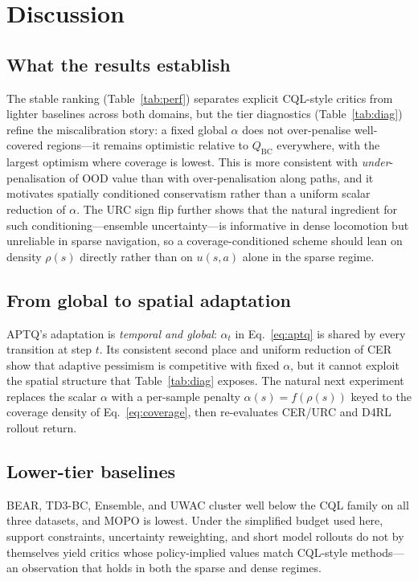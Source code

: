\documentclass[conference]{IEEEtran}
\begin{document}
\section{Discussion}
\label{sec:discussion}

\subsection{What the results establish}

The stable ranking (Table~\ref{tab:perf}) separates explicit CQL-style
critics from lighter baselines across both domains, but the tier diagnostics
(Table~\ref{tab:diag}) refine the miscalibration story: a fixed global
$\alpha$ does not over-penalise well-covered regions---it remains optimistic
relative to $Q_{\mathrm{BC}}$ everywhere, with the largest optimism where
coverage is lowest. This is more consistent with \emph{under}-penalisation of
OOD value than with over-penalisation along paths, and it motivates
spatially conditioned conservatism rather than a uniform scalar reduction of
$\alpha$. The URC sign flip further shows that the natural ingredient for
such conditioning---ensemble uncertainty---is informative in dense
locomotion but unreliable in sparse navigation, so a coverage-conditioned
scheme should lean on density $\rho(s)$ directly rather than on $u(s,a)$
alone in the sparse regime.

\subsection{From global to spatial adaptation}

APTQ's adaptation is \emph{temporal and global}: $\alpha_t$ in
Eq.~\eqref{eq:aptq} is shared by every transition at step $t$. Its
consistent second place and uniform reduction of CER show that adaptive
pessimism is competitive with fixed $\alpha$, but it cannot exploit the
spatial structure that Table~\ref{tab:diag} exposes. The natural next
experiment replaces the scalar $\alpha$ with a per-sample penalty
$\alpha(s)=f(\rho(s))$ keyed to the coverage density of
Eq.~\eqref{eq:coverage}, then re-evaluates CER/URC and D4RL rollout return.

\subsection{Lower-tier baselines}

BEAR, TD3-BC, Ensemble, and UWAC cluster well below the CQL family on all
three datasets, and MOPO is lowest. Under the simplified budget used here,
support constraints, uncertainty reweighting, and short model rollouts do
not by themselves yield critics whose policy-implied values match CQL-style
methods---an observation that holds in both the sparse and dense regimes.
\end{document}
